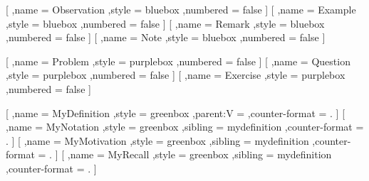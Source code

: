 {        %
        [
            ,name = Observation
            ,style = bluebox
            ,numbered = false
        ]
        [
            ,name = Example
            ,style = bluebox
            ,numbered = false
        ]
        [
            ,name = Remark
            ,style = bluebox
            ,numbered = false
        ]
        [
            ,name = Note
            ,style = bluebox
            ,numbered = false
        ]

        [
            ,name = Problem
            ,style = purplebox
            ,numbered = false
        ]
        [
            ,name = Question
            ,style = purplebox
            ,numbered = false
        ]
        [
            ,name = Exercise
            ,style = purplebox
            ,numbered = false
        ]

        [
            ,name = MyDefinition
            ,style = greenbox
            ,parent:V = \DefinitionParent
            ,counter-format = .
        ]
        [
            ,name = MyNotation
            ,style = greenbox
            ,sibling = mydefinition
            ,counter-format = .
        ]
        [
            ,name = MyMotivation
            ,style = greenbox
            ,sibling = mydefinition
            ,counter-format = .
        ]
        [
            ,name = MyRecall
            ,style = greenbox
            ,sibling = mydefinition
            ,counter-format = .
        ]

}
